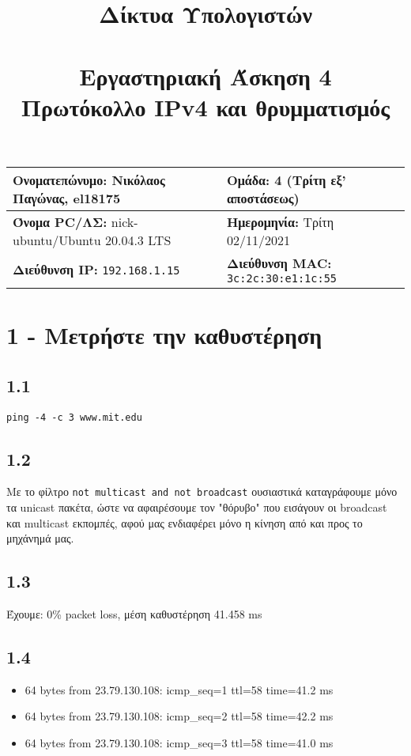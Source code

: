 

\newcommand{\imagesPath}{.}

\title{
	\textbf{Δίκτυα Υπολογιστών} \\~\\
	Εργαστηριακή Άσκηση 4 \\ 
	Πρωτόκολλο IPv4 και θρυμματισμός
}
\author{}
\date{}


	\maketitle
	
	\begin{tabular}{|l|l|}
		\hline
		\textbf{Ονοματεπώνυμο:} Νικόλαος Παγώνας, el18175 & \textbf{Ομάδα:} 4 (Τρίτη εξ' αποστάσεως) \\
		\hline
		\textbf{Όνομα PC/ΛΣ:} nick-ubuntu/Ubuntu 20.04.3 LTS & \textbf{Ημερομηνία:} Τρίτη 02/11/2021  \\
		\hline
		\textbf{Διεύθυνση IP:} \verb|192.168.1.15| & \textbf{Διεύθυνση MAC:} \verb|3c:2c:30:e1:1c:55|\\
		\hline
	\end{tabular}

	\section*{1 - Μετρήστε την καθυστέρηση}
		
		\subsection*{1.1}
			\verb|ping -4 -c 3 www.mit.edu|
	
		\subsection*{1.2}
			Με το φίλτρο \verb|not multicast and not broadcast| ουσιαστικά καταγράφουμε μόνο τα unicast πακέτα, ώστε να αφαιρέσουμε τον "θόρυβο" που εισάγουν οι broadcast και multicast εκπομπές, αφού μας ενδιαφέρει μόνο η κίνηση από και προς το μηχάνημά μας. 
			

		\subsection*{1.3}
			Έχουμε: 0\% packet loss, μέση καθυστέρηση 41.458 ms

		\subsection*{1.4}
			\begin{itemize}
				\item 64 bytes from 23.79.130.108: icmp\_seq=1 ttl=58 time=41.2 ms
				\item 64 bytes from 23.79.130.108: icmp\_seq=2 ttl=58 time=42.2 ms
				\item 64 bytes from 23.79.130.108: icmp\_seq=3 ttl=58 time=41.0 ms
				
			\end{itemize}
		
